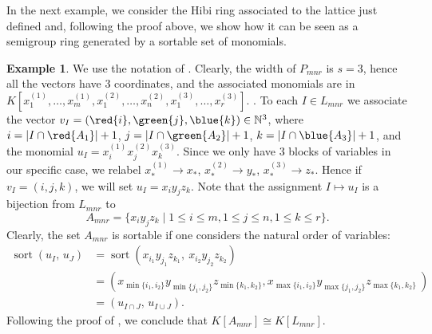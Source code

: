 \documentclass[12pt]{amsart}
\numberwithin{equation}{section}
\theoremstyle{definition}
\newtheorem{example}[theorem]{Example}
\def\sort{\operatorname{sort}}
\begin{document}
In the next example, we consider the Hibi ring associated to the lattice just defined and, following the proof above, we show how it can be seen as a semigroup ring generated by a sortable set of monomials.
\begin{example}
\label{ex: hibisortable}
 We use the notation of . Clearly, the width of $P_{mnr}$ is $s=3$, hence all the vectors have $3$ coordinates, and the associated monomials are in $K[x^{(1)}_{1},\ldots, x^{(1)}_{m}, x^{(2)}_{1},\ldots, x^{(2)}_{n}, x^{(3)}_{1},\ldots, x^{(3)}_{r}]$.
 .  
To each $I\in L_{mnr}$ we associate the vector $v_I=(\red{i},\green{j},\blue{k}) \in  \mathbb{N}^3$, where $i=|I\cap \red{A_1}|+1$, $j=|I\cap \green{A_2}|+1$, $k=|I\cap \blue{A_3}|+1$, and  the monomial $u_I=x_i^{(1)}x_j^{(2)}x_k^{(3)}$. Since we only have $3$ blocks of variables in our specific case, we  relabel $x_{*}^{(1)}\rightarrow x_{*}$, $x_{*}^{(2)}\rightarrow y_{*}$, $x_{*}^{(3)}\rightarrow z_{*}$. Hence if $v_I=(i,j,k)$, we will set  $u_I=x_iy_jz_k$. Note that the assignment $I\mapsto u_I$ is a bijection from $L_{mnr}$ to 
$$A_{mnr}=\{x_iy_jz_k\mid 1\le i\le m, 1\le j\le n,1\le k\le r\}.$$ Clearly, the set $A_{mnr}$ is sortable if one considers the natural order of variables:
\begin{align*}
\sort(u_I,\, u_J) &= \sort(x_{i_1}y_{j_1}z_{k_1},\ x_{i_2}y_{j_2}z_{k_2})\\
&=(x_{\min\{i_1,i_2\}}y_{\min\{j_1,j_2\}}z_{\min\{k_1,k_2\}},x_{\max\{i_1,i_2\}}y_{\max\{j_1,j_2\}}z_{\max\{k_1,k_2\}}\ )\\ &= (u_{I\cap J},\, u_{I\cup J}).
\end{align*}
Following the proof of , we conclude that $K[A_{mnr}]\cong K[L_{mnr}]$.
\iffalse
\begin{figure}[H]
\centering
{}
\end{figure}
\end{example}
\end{document}
